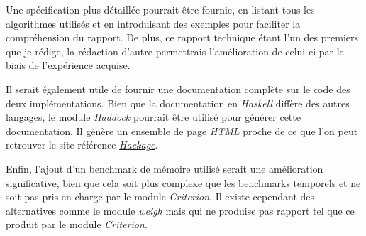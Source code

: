 \vphantom{}

Une spécification plus détaillée pourrait être fournie, en listant tous les 
algorithmes utilisés et en introduisant des exemples pour faciliter la 
compréhension du rapport. De plus, ce rapport technique étant l'un des premiers 
que je rédige, la rédaction d'autre permettrais l'amélioration de celui-ci par 
le biais de l'expérience acquise.

\vphantom{}

Il serait également utile de fournir une documentation complète sur le code des 
deux implémentations. Bien que la documentation en \textit{Haskell} diffère des 
autres langages, le module \textit{Haddock} pourrait être utilisé pour générer 
cette documentation. Il génère un ensemble de page \textit{HTML} proche de ce 
que l'on peut retrouver le site référence
\href{https://hackage.haskell.org/}{\textit{Hackage}}.

\vphantom{}

Enfin, l'ajout d'un benchmark de mémoire utilisé serait une amélioration 
significative, bien que cela soit plus complexe que les benchmarks temporels et 
ne soit pas pris en charge par le module \textit{Criterion}. Il existe cependant 
des alternatives comme le module \textit{weigh} mais qui ne produise pas rapport 
tel que ce produit par le module \textit{Criterion}. 
